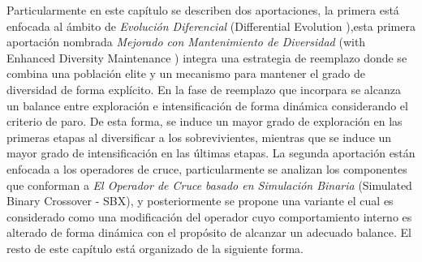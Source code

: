 %
Particularmente en este capítulo se describen dos aportaciones, la primera está enfocada al ámbito de \textit{Evolución Diferencial} (Differential Evolution \DE{}),esta primera aportación nombrada \DE{} \textit{Mejorado con Mantenimiento de Diversidad} (\DE with Enhanced Diversity Maintenance \DEEDM{}) integra una estrategia de reemplazo donde se combina una población elite y un mecanismo para mantener el grado de diversidad de forma explícito.
%
En la fase de reemplazo que incorpara \DEEDM{} se alcanza un balance entre exploración e intensificación de forma dinámica considerando el criterio de paro.
%
De esta forma, se induce un mayor grado de exploración en las primeras etapas al diversificar a los sobrevivientes, mientras que se induce un mayor grado de intensificación en las últimas etapas.
% 
La segunda aportación están enfocada a los operadores de cruce, particularmente se analizan los componentes que conforman a \textit{El Operador de Cruce basado en Simulación Binaria} (Simulated Binary Crossover - SBX), y posteriormente se propone una variante \DSBX{} el cual es considerado como una modificación del operador \SBX{} cuyo comportamiento interno es alterado de forma dinámica con el propósito de alcanzar un adecuado balance.
%
El resto de este capítulo está organizado de la siguiente forma.
